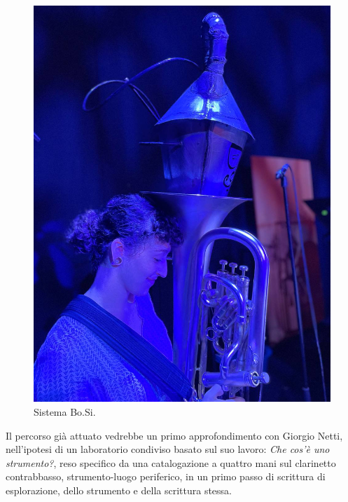 \documentclass{gs-adonis}
\begin{document}

\begin{figure}[t]
  \centering
  \includegraphics[width=\linewidth]{images/IMG_F5A47D566D6E-31.jpeg}
  \captionsetup{width=.81\linewidth}
  \caption{Sistema Bo.Si.}
  \label{bosi}
\end{figure}

Il percorso già attuato vedrebbe un primo approfondimento con Giorgio Netti,
nell'ipotesi di un laboratorio condiviso basato sul suo lavoro:
\emph{Che cos'è uno strumento?}\cite{netti23}, reso specifico da una catalogazione
a quattro mani sul clarinetto contrabbasso, strumento-luogo periferico, in un
primo passo di scrittura di esplorazione, dello strumento e della scrittura
stessa.
\end{document}
